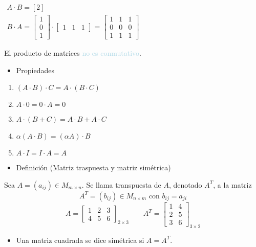 \begin{itemize}[label=\color{lightblue}\textbullet, leftmargin=*]
	$\begin{array}{l}
		A\cdot B=[2]\\
		B\cdot A=\begin{bmatrix}
			1\\
			0\\
			1
		\end{bmatrix}\cdot\begin{bmatrix}
		1 & 1 & 1
		\end{bmatrix}=\begin{bmatrix}
		1 & 1 & 1\\
		0 &0 & 0\\
		1 & 1 & 1
		\end{bmatrix}
	\end{array}$
	
	El producto de matrices \textcolor{lightblue}{no es conmutativo}.
\end{itemize}
\begin{itemize}[label=\color{red}\textbullet, leftmargin=*]
	\item \color{lightblue}Propiedades
\end{itemize}
\begin{enumerate}[label=\color{lightblue}\arabic*)]
	\item $(A\cdot B)\cdot C=A\cdot(B\cdot C)$
	\item $A\cdot 0=0\cdot A=0$
	\item $A\cdot(B+C)=A\cdot B+A\cdot C$
	\item $\alpha(A\cdot B)=(\alpha A)\cdot B$
	\item $A\cdot I=I\cdot A=A$
\end{enumerate}
\begin{itemize}[label=\color{red}\textbullet, leftmargin=*]
	\item \color{lightblue}Definición (Matriz traspuesta y matriz simétrica)
\end{itemize}
Sea $A=(a_{ij})\in M_{m\times n}$. Se llama transpuesta de $A$, denotado $A^T$, a la matriz \[ A^T=(b_{ij})\in M_{n\times m}\text{ con }b_{ij}=a_{ji} \]
\Ej
\[A=\begin{bmatrix}
	1 & 2 & 3 \\
	4 & 5 & 6
\end{bmatrix}_{2\times 3}\qquad A^T=\begin{bmatrix}
1 & 4 \\
2 & 5 \\
3 & 6
\end{bmatrix}_{3\times 2} \]
\begin{itemize}[leftmargin=*]
	\item Una matriz cuadrada se dice simétrica si $A=A^T$.
\end{itemize}
